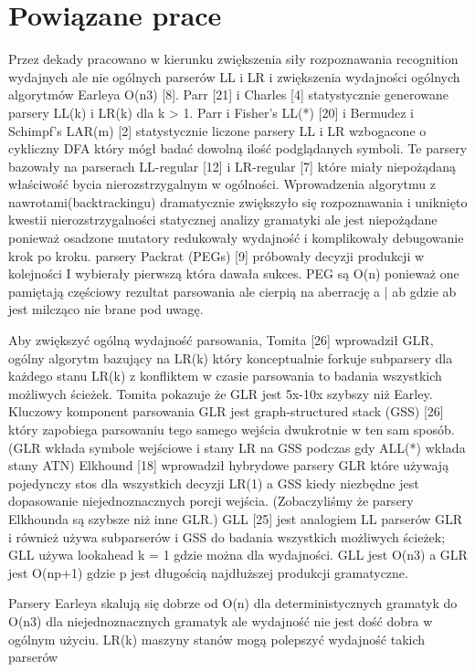 ﻿\section{Powiązane prace}
Przez dekady pracowano w kierunku zwiększenia
siły rozpoznawania recognition wydajnych ale nie ogólnych
parserów LL i LR i zwiększenia wydajności ogólnych algorytmów
Earleya O(n3) [8]. Parr [21] i Charles [4] statystycznie generowane parsery LL(k) i LR(k)
dla k > 1. Parr i Fisher’s LL(*) [20] i Bermudez i Schimpf’s LAR(m) [2]
statystycznie liczone parsery LL i LR wzbogacone o cykliczny
DFA który mógł badać dowolną ilość podglądanych symboli. Te
parsery bazowały na parserach LL-regular [12] i LR-regular [7]
które miały niepożądaną właściwość bycia nierozstrzygalnym w ogólności.
Wprowadzenia algorytmu z nawrotami(backtrackingu) dramatycznie zwiększyło się rozpoznawania
i uniknięto kwestii nierozstrzygalności statycznej analizy gramatyki
ale jest niepożądane ponieważ osadzone mutatory redukowały wydajność
i komplikowały debugowanie krok po kroku. parsery Packrat (PEGs) [9] próbowały decyzji
produkcji w kolejności I wybierały pierwszą która dawała sukces. PEG są
O(n) ponieważ one pamiętają częściowy rezultat parsowania ale cierpią
na aberrację a | ab gdzie ab jest milcząco nie brane pod uwagę.
\par
Aby zwiększyć ogólną wydajność parsowania, Tomita [26] wprowadził GLR, ogólny algorytm
bazujący na LR(k) który konceptualnie forkuje subparsery dla każdego stanu
LR(k) z konfliktem w czasie parsowania to badania wszystkich możliwych ścieżek.
Tomita pokazuje że GLR jest 5x-10x szybszy niż Earley. Kluczowy komponent
parsowania GLR jest graph-structured stack (GSS) [26] który zapobiega parsowaniu
tego samego wejścia dwukrotnie w ten sam sposób.
(GLR wkłada symbole wejściowe i stany LR na GSS podczas gdy ALL(*) wkłada stany ATN)
Elkhound [18] wprowadził hybrydowe parsery GLR które używają pojedynczy stos
dla wszystkich decyzji LR(1) a GSS kiedy niezbędne jest dopasowanie
niejednoznacznych porcji wejścia. (Zobaczyliśmy że parsery Elkhounda
są szybsze niż inne GLR.) GLL [25] jest analogiem LL parserów GLR
i również używa subparserów i GSS do badania wszystkich możliwych ścieżek;
GLL używa lookahead k = 1 gdzie można dla wydajności.
GLL jest O(n3) a GLR jest O(np+1)
gdzie p jest długością najdłuższej produkcji gramatyczne.
\par
Parsery Earleya skalują się dobrze od  O(n) dla deterministycznych gramatyk
do O(n3) dla niejednoznacznych gramatyk ale wydajność
nie jest dość dobra w ogólnym użyciu.
LR(k) maszyny stanów mogą polepszyć wydajność takich parserów
